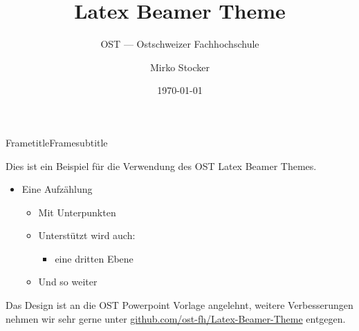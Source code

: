 \documentclass[aspectratio=169,20pt]{beamer}
\title{Latex Beamer Theme}
\subtitle{OST — Ostschweizer Fachhochschule}
\date{\today}
\author{Mirko Stocker}
\institute{Institut für Software}
\begin{document}
\begin{frame}
    \titlepage
\end{frame}

\begin{frame}{Frametitle}{Framesubtitle}

    Dies ist ein Beispiel für die Verwendung des OST Latex Beamer Themes.

    \begin{itemize}
        \item{Eine Aufzählung}
              \begin{itemize}
                  \item{Mit Unterpunkten}
                  \item{Unterstützt wird auch:}
                        \begin{itemize}
                            \item{eine dritten Ebene}
                        \end{itemize}
                  \item{Und so weiter}
              \end{itemize}
    \end{itemize}

    Das Design ist an die OST Powerpoint Vorlage angelehnt, weitere Verbesserungen nehmen wir sehr gerne unter \href{https://github.com/ost-fh/Latex-Beamer-Theme}{github.com/ost-fh/Latex-Beamer-Theme} entgegen.

\end{frame}
\end{document}
